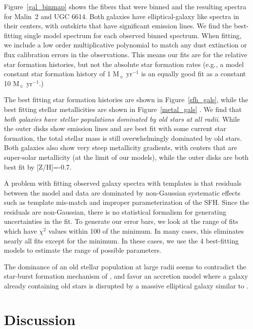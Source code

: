 \documentclass[12pt,preprint]{aastex}
\begin{document}
Figure~\ref{gal_binmap} shows the fibers that were binned and the resulting spectra for Malin~2 and UGC 6614.
Both galaxies have elliptical-galaxy like spectra in their centers, with outskirts that have significant emission lines.
We find the best-fitting single model spectrum for each observed binned spectrum. When fitting, we include a low order multiplicative polynomial to match any dust extinction or flux calibration errors in the observations.
This means our fits are for the relative star formation histories, but not the absolute star formation rates (e.g., a model constant star formation history of 1 M$_\sun$ yr$^{-1}$ is an equally good fit as a constant 10 M$_\sun$ yr$^{-1}$.)


The best fitting star formation histories are shown in Figure~\ref{sfh_gals}, while the best fitting stellar metallicities are shown in Figure~\ref{metal_gals} .
We find that {\emph{both galaxies have stellar populations dominated by old stars at all radii}}.
While the outer disks show emission lines and are best fit with some current star formation, the total stellar mass is still overwhelmingly dominated by old stars.
Both galaxies also show very steep metallicity gradients, with centers that are super-solar metallicity (at the limit of our models), while the outer disks are both best fit by [Z/H]=-0.7.


A problem with fitting observed galaxy spectra with templates is that residuals between the model and data are dominated by non-Gaussian systematic effects such as template mis-match and improper parameterization of the SFH.
Since the residuals are non-Gaussian, there is no statistical formalism for generating uncertainties in the fit.
To generate our error bars, we look at the range of fits which have $\chi^2$ values within 100 of the minimum.
In many cases, this eliminates nearly all fits except for the minimum.
In these cases, we use the 4 best-fitting models to estimate the range of possible parameters.


The dominance of an old stellar population at large radii seems to contradict the star-burst formation mechanism of \citet{Mapelli08}, and favor an accretion model where a galaxy already containing old stars is disrupted by a massive elliptical galaxy similar to \citet{Pen06}.





\section{Discussion}\label{sec:discussion}
\end{document}
